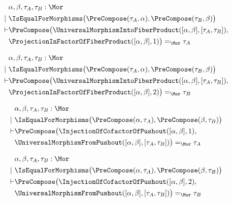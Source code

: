 \begin{sequent}
\begin{align*}
  &\alpha, \beta, \tau_A, \tau_B:\Mor \\
  |~ &\IsEqualForMorphisms\big( \PreCompose( \tau_A, \alpha ), \PreCompose( \tau_B, \beta ) \big)\\
  \vdash &\PreCompose\big( \UniversalMorphismIntoFiberProduct( [\alpha, \beta], [\tau_A, \tau_B] ), \\
  &\ProjectionInFactorOfFiberProduct( [\alpha, \beta], 1 ) \big) =_{\Mor} \tau_A
\end{align*}
\end{sequent}

\begin{sequent}
\begin{align*}
  &\alpha, \beta, \tau_A, \tau_B:\Mor \\
  |~ &\IsEqualForMorphisms\big( \PreCompose( \tau_A, \alpha ), \PreCompose( \tau_B, \beta ) \big)\\
  \vdash &\PreCompose\big( \UniversalMorphismIntoFiberProduct( [\alpha, \beta], [\tau_A, \tau_B] ), \\
  &\ProjectionInFactorOfFiberProduct( [\alpha, \beta], 2 ) \big) =_{\Mor} \tau_B
\end{align*}
\end{sequent}

\begin{sequent}
\begin{align*}
  &\alpha, \beta, \tau_A, \tau_B:\Mor \\
  |~ &\IsEqualForMorphisms\big( \PreCompose( \alpha, \tau_A ), \PreCompose( \beta, \tau_B) \big)\\
  \vdash &\PreCompose\big( \InjectionOfCofactorOfPushout( [\alpha, \beta], 1 ), \\
  &\UniversalMorphismFromPushout( [\alpha, \beta], [\tau_A, \tau_B] )\big) =_{\Mor} \tau_A
\end{align*}
\end{sequent}

\begin{sequent}
\begin{align*}
  &\alpha, \beta, \tau_A, \tau_B:\Mor \\
  |~ &\IsEqualForMorphisms\big( \PreCompose( \alpha, \tau_A ), \PreCompose( \beta, \tau_B) \big)\\
  \vdash &\PreCompose\big( \InjectionOfCofactorOfPushout( [\alpha, \beta], 2 ), \\
  &\UniversalMorphismFromPushout( [\alpha, \beta], [\tau_A, \tau_B] )\big) =_{\Mor} \tau_B
\end{align*}
\end{sequent}
